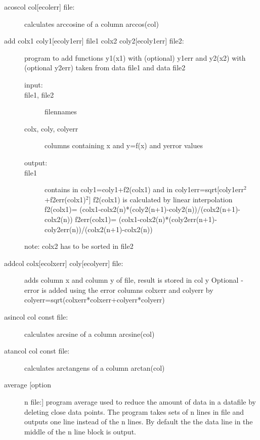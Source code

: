 \begin{description}
\item [\prg acoscol col{[ecolerr]} file:] calculates arccosine of a column arccos(col) 
\item [\prg add colx1 coly1{[ecoly1err]} file1 colx2 coly2{[ecoly1err]} file2:] 
   program to add functions y1(x1) with (optional) y1err and y2(x2) with (optional y2err)
       taken from data file1 and data file2

\begin{description}
 \item [input:]
 \item[ file1, file2]         filennames
 \item [colx, coly, colyerr]  columns containing x and y=f(x) and yerror values
\item[  output:]
\item[  file1]            contains in coly1=coly1+f2(colx1)
                   and in   coly1err=sqrt[coly1err$^2$+f2err(colx1)$^2$]
                   f2(colx1) is calculated by linear
                   interpolation
                   f2(colx1)=
                   (colx1-colx2(n)*(coly2(n+1)-coly2(n))/(colx2(n+1)-colx2(n))
                   f2err(colx1)=
                   (colx1-colx2(n)*(coly2err(n+1)-coly2err(n))/(colx2(n+1)-colx2(n))
\end{description}
  note:            colx2 has to be sorted in file2
\item [\prg addcol  colx{[ecolxerr]} coly{[ecolyerr]} file:] adds column x and column y of file, result is %
stored in col y
Optional - error is added using the error columns colxerr and colyerr
by colyerr=sqrt(colxerr*colxerr+colyerr*colyerr)
\item [\prg asincol col const file:] calculates arcsine of a column arcsine(col) 
\item [\prg atancol col const file:] calculates arctangens of a column %
arctan(col) 
\item [\prg average [option] n file:] program average  used  to 
 reduce the amount of data in a datafile by deleting close data points.
 The program takes sets of n lines in file and  outputs one line instead
of the n lines. By default the the data line in the middle of the n line
block is output. 
 

\end{description}

